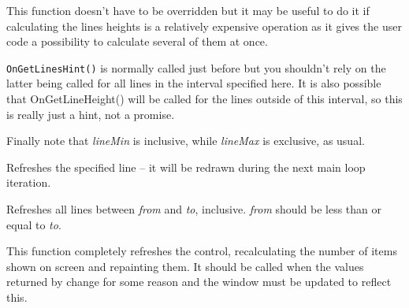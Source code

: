 \label{wxvscrolledwindowongetlineshint}


This function doesn't have to be overridden but it may be useful to do
it if calculating the lines heights is a relatively expensive operation
as it gives the user code a possibility to calculate several of them at
once.

{\tt OnGetLinesHint()} is normally called just before
 but you
shouldn't rely on the latter being called for all lines in the interval
specified here. It is also possible that OnGetLineHeight() will be
called for the lines outside of this interval, so this is really just a
hint, not a promise.

Finally note that {\it lineMin} is inclusive, while {\it lineMax} is exclusive,
as usual.


\label{wxvscrolledwindowrefreshline}


Refreshes the specified line -- it will be redrawn during the next main loop
iteration.




\label{wxvscrolledwindowrefreshlines}


Refreshes all lines between {\it from} and {\it to}, inclusive. {\it from}
should be less than or equal to {\it to}.




\label{wxvscrolledwindowrefreshall}


This function completely refreshes the control, recalculating the number of
items shown on screen and repainting them. It should be called when the values
returned by  change
for some reason and the window must be updated to reflect this.


